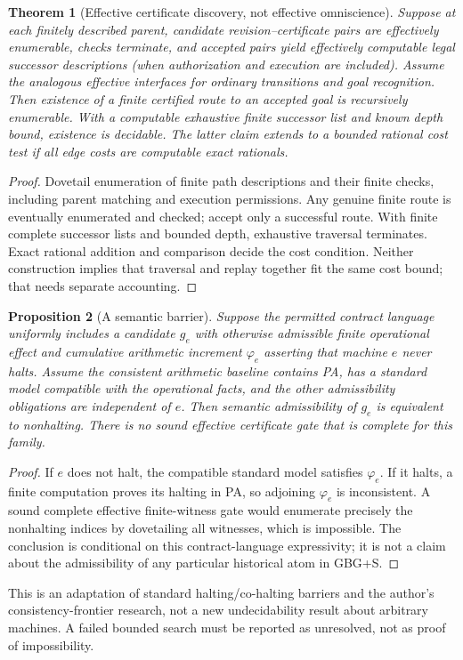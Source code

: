 \documentclass[11pt]{article}
\newtheorem{theorem}{Theorem}[section]
\newtheorem{proposition}[theorem]{Proposition}
\theoremstyle{remark}\newtheorem{remark}[theorem]{Remark}
\begin{document}
\begin{theorem}[Effective certificate discovery, not effective omniscience]
Suppose at each finitely described parent, candidate revision--certificate pairs are effectively enumerable, checks terminate, and accepted pairs yield effectively computable legal successor descriptions (when authorization and execution are included). Assume the analogous effective interfaces for ordinary transitions and goal recognition. Then existence of a finite certified route to an accepted goal is recursively enumerable. With a computable exhaustive finite successor list and known depth bound, existence is decidable. The latter claim extends to a bounded rational cost test if all edge costs are computable exact rationals.
\end{theorem}
\begin{proof}
Dovetail enumeration of finite path descriptions and their finite checks, including parent matching and execution permissions. Any genuine finite route is eventually enumerated and checked; accept only a successful route. With finite complete successor lists and bounded depth, exhaustive traversal terminates. Exact rational addition and comparison decide the cost condition. Neither construction implies that traversal and replay together fit the same cost bound; that needs separate accounting.
\end{proof}
\begin{proposition}[A semantic barrier]
Suppose the permitted contract language uniformly includes a candidate $g_e$ with otherwise admissible finite operational effect and cumulative arithmetic increment $\varphi_e$ asserting that machine $e$ never halts. Assume the consistent arithmetic baseline contains PA, has a standard model compatible with the operational facts, and the other admissibility obligations are independent of $e$. Then semantic admissibility of $g_e$ is equivalent to nonhalting. There is no sound effective certificate gate that is complete for this family.
\end{proposition}
\begin{proof}
If $e$ does not halt, the compatible standard model satisfies $\varphi_e$. If it halts, a finite computation proves its halting in PA, so adjoining $\varphi_e$ is inconsistent. A sound complete effective finite-witness gate would enumerate precisely the nonhalting indices by dovetailing all witnesses, which is impossible. The conclusion is conditional on this contract-language expressivity; it is not a claim about the admissibility of any particular historical atom in GBG+S.
\end{proof}
This is an adaptation of standard halting/co-halting barriers and the author's consistency-frontier research, not a new undecidability result about arbitrary machines. A failed bounded search must be reported as unresolved, not as proof of impossibility.
\end{document}

